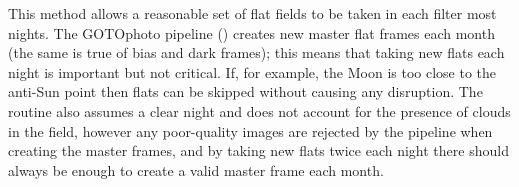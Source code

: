 \begin{colsection}
This method allows a reasonable set of flat fields to be taken in each filter most nights. The GOTOphoto pipeline () creates new master flat frames each month (the same is true of bias and dark frames); this means that taking new flats each night is important but not critical. If, for example, the Moon is too close to the anti-Sun point then flats can be skipped without causing any disruption. The routine also assumes a clear night and does not account for the presence of clouds in the field, however any poor-quality images are rejected by the pipeline when creating the master frames, and by taking new flats twice each night there should always be enough to create a valid master frame each month.

\end{colsection}


